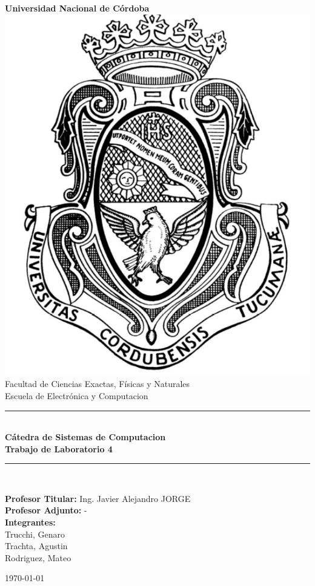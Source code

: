 \begin{titlepage}
    \begin{center}
        {\LARGE \textbf{Universidad Nacional de Córdoba}}\\[1.5cm]

        \includegraphics[scale=0.4]{images/logo2.png}\\[1.5cm]

        {\large Facultad de Ciencias Exactas, Físicas y Naturales}\\
        {\large Escuela de Electrónica y Computacion}\\[1cm]

        \rule{\linewidth}{0.5mm}\\[0.4cm]
        {\Large \textbf{Cátedra de Sistemas de Computacion}}\\[0.3cm]
        {\LARGE \textbf{Trabajo de Laboratorio 4}}\\[0.3cm]

        \rule{\linewidth}{0.5mm}\\[1cm]

        \begin{flushleft}
        {\large 
            \textbf{Profesor Titular:} Ing. Javier Alejandro JORGE\\
            \textbf{Profesor Adjunto:} -\\[0.5cm]
            \textbf{Integrantes:}\\
            Trucchi, Genaro\\
            Trachta, Agustin\\
            Rodriguez, Mateo\\
        }
        \end{flushleft}

        \vfill

        {\large \today}
    \end{center}
\end{titlepage}
